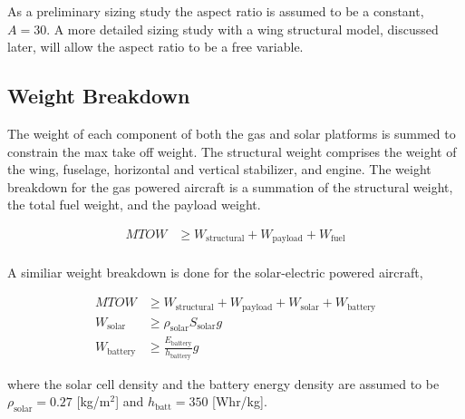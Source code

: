 \documentclass[]{aiaa-tc}%
\begin{document}
As a preliminary sizing study the aspect ratio is assumed to be a constant, $A = 30$.  A more detailed sizing study with a wing structural model, discussed later, will allow the aspect ratio to be a free variable. 

\subsection{Weight Breakdown}

The weight of each component of both the gas and solar platforms is summed to constrain the max take off weight.  
The structural weight comprises the weight of the wing, fuselage, horizontal and vertical stabilizer, and engine. 
The weight breakdown for the gas powered aircraft is a summation of the structural weight, the total fuel weight, and the payload weight. 

\begin{align}
    \label{e:weightmtow}
    MTOW &\geq W_{\text{structural}}  + W_{\text{payload}} + W_{\text{fuel}} \\
\end{align}

A similiar weight breakdown is done for the solar-electric powered aircraft, 

\begin{align}
    \label{e:weightsmtow}
    MTOW &\geq W_{\text{structural}} + W_{\text{payload}} + W_{\text{solar}} + W_{\text{battery}} \\
    W_{\text{solar}} &\geq \rho_{\text{solar}} S_{\text{solar}} g \\
    W_{\text{battery}} &\geq \frac{E_{\text{battery}}}{h_{\text{battery}}} g
\end{align}

where the solar cell density and the battery energy density are assumed to be $\rho_{\text{solar}} = 0.27$ [kg/m$^2$] and $h_{\text{batt}} = 350$ [Whr/kg].\cite{solartech}\cite{solarparam}
\end{document}
